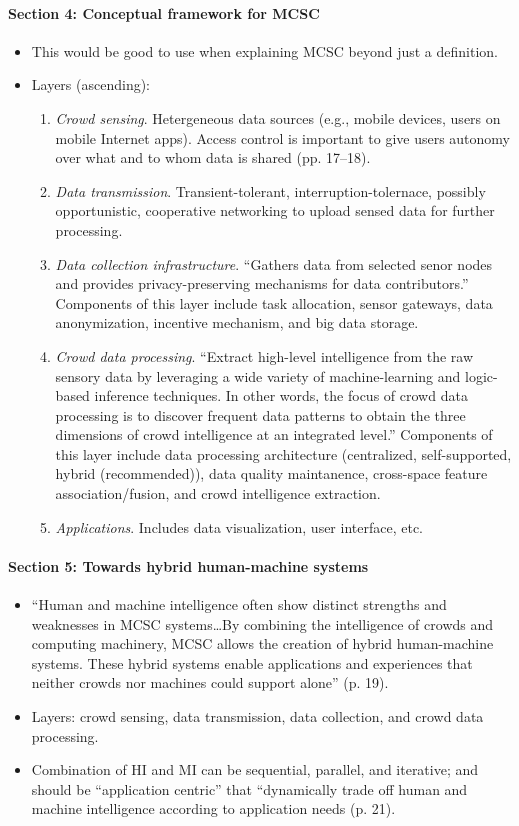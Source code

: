 \paragraph{Section 4: Conceptual framework for MCSC}
	\begin{itemize}
	\item This would be good to use when explaining MCSC beyond just a definition.
	\item Layers (ascending):
		\begin{enumerate}
		\item \emph{Crowd sensing}. Hetergeneous data sources (e.g., mobile devices, users on mobile Internet apps). Access control is important to give users autonomy over what and to whom data is shared (pp. 17--18).
		\item \emph{Data transmission}. Transient-tolerant, interruption-tolernace, possibly opportunistic, cooperative networking to upload sensed data for further processing.
		\item \emph{Data collection infrastructure}. ``Gathers data from selected senor nodes and provides privacy-preserving mechanisms for data contributors.'' Components of this layer include task allocation, sensor gateways, data anonymization, incentive mechanism, and big data storage.
		\item \emph{Crowd data processing}. ``Extract high-level intelligence from the raw sensory data by leveraging a wide variety of machine-learning and logic-based inference techniques. In other words, the focus of crowd data processing is to discover frequent data patterns to obtain the three dimensions of crowd intelligence at an integrated level.'' Components of this layer include data processing architecture (centralized, self-supported, hybrid (recommended)), data quality maintanence, cross-space feature association/fusion, and crowd intelligence extraction.
		\item \emph{Applications}. Includes data visualization, user interface, etc.
		\end{enumerate}
	\end{itemize}
\paragraph{Section 5: Towards hybrid human-machine systems}
	\begin{itemize}
	\item ``Human and machine intelligence often show distinct strengths and weaknesses in MCSC systems{\ldots}By combining the intelligence of crowds and computing machinery, MCSC allows the creation of hybrid human-machine systems. These hybrid systems enable applications and experiences that neither crowds nor machines could support alone'' (p. 19).
	\item Layers: crowd sensing, data transmission, data collection, and crowd data processing.
	\item Combination of HI and MI can be sequential, parallel, and iterative; and should be ``application centric'' that ``dynamically trade off human and machine intelligence according to application needs (p. 21).
	\end{itemize}

